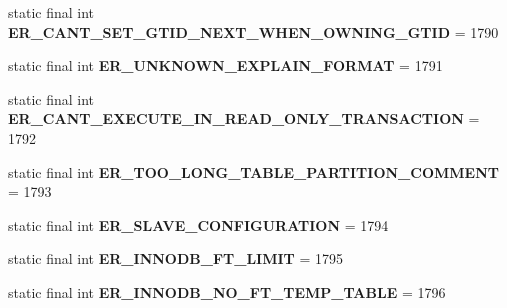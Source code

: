 \begin{DoxyCompactItemize}
static final int {\bfseries E\+R\+\_\+\+C\+A\+N\+T\+\_\+\+S\+E\+T\+\_\+\+G\+T\+I\+D\+\_\+\+N\+E\+X\+T\+\_\+\+W\+H\+E\+N\+\_\+\+O\+W\+N\+I\+N\+G\+\_\+\+G\+T\+ID} = 1790
\item 
\mbox{\label{classcom_1_1mysql_1_1jdbc_1_1_mysql_error_numbers_a510b0e4d50529461007c3b1586f73e5d}} 
static final int {\bfseries E\+R\+\_\+\+U\+N\+K\+N\+O\+W\+N\+\_\+\+E\+X\+P\+L\+A\+I\+N\+\_\+\+F\+O\+R\+M\+AT} = 1791
\item 
\mbox{\label{classcom_1_1mysql_1_1jdbc_1_1_mysql_error_numbers_aae92da133259817692b1b42c12770481}} 
static final int {\bfseries E\+R\+\_\+\+C\+A\+N\+T\+\_\+\+E\+X\+E\+C\+U\+T\+E\+\_\+\+I\+N\+\_\+\+R\+E\+A\+D\+\_\+\+O\+N\+L\+Y\+\_\+\+T\+R\+A\+N\+S\+A\+C\+T\+I\+ON} = 1792
\item 
\mbox{\label{classcom_1_1mysql_1_1jdbc_1_1_mysql_error_numbers_a193349d5d37c8a527278e2ba83bd7d12}} 
static final int {\bfseries E\+R\+\_\+\+T\+O\+O\+\_\+\+L\+O\+N\+G\+\_\+\+T\+A\+B\+L\+E\+\_\+\+P\+A\+R\+T\+I\+T\+I\+O\+N\+\_\+\+C\+O\+M\+M\+E\+NT} = 1793
\item 
\mbox{\label{classcom_1_1mysql_1_1jdbc_1_1_mysql_error_numbers_a7edb75c5decec8937c2db2ac60595cc2}} 
static final int {\bfseries E\+R\+\_\+\+S\+L\+A\+V\+E\+\_\+\+C\+O\+N\+F\+I\+G\+U\+R\+A\+T\+I\+ON} = 1794
\item 
\mbox{\label{classcom_1_1mysql_1_1jdbc_1_1_mysql_error_numbers_aa2e49fc7056828d1a0a41e24d757f156}} 
static final int {\bfseries E\+R\+\_\+\+I\+N\+N\+O\+D\+B\+\_\+\+F\+T\+\_\+\+L\+I\+M\+IT} = 1795
\item 
\mbox{\label{classcom_1_1mysql_1_1jdbc_1_1_mysql_error_numbers_a25521e0b8e740ec9ddb549719dc86ed8}} 
static final int {\bfseries E\+R\+\_\+\+I\+N\+N\+O\+D\+B\+\_\+\+N\+O\+\_\+\+F\+T\+\_\+\+T\+E\+M\+P\+\_\+\+T\+A\+B\+LE} = 1796
\item 
\mbox{\label{classcom_1_1mysql_1_1jdbc_1_1_mysql_error_numbers_ae811abc4dd35c50699c2d021fc00852a}} 

\end{DoxyCompactItemize}

